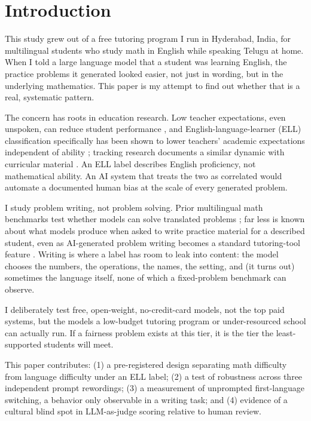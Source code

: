 \documentclass[runningheads]{llncs}
\begin{document}
\section{Introduction}

This study grew out of a free tutoring program I run in Hyderabad, India, for multilingual students who study math in English while speaking Telugu at home. When I told a large language model that a student was learning English, the practice problems it generated looked easier, not just in wording, but in the underlying mathematics. This paper is my attempt to find out whether that is a real, systematic pattern.

The concern has roots in education research. Low teacher expectations, even unspoken, can reduce student performance \cite{rosenthal1968,steele1995}, and English-language-learner (ELL) classification specifically has been shown to lower teachers' academic expectations independent of ability \cite{umansky2021}; tracking research documents a similar dynamic with curricular material \cite{oakes1985}. An ELL label describes English proficiency, not mathematical ability. An AI system that treats the two as correlated would automate a documented human bias at the scale of every generated problem.

I study problem writing, not problem solving. Prior multilingual math benchmarks test whether models can solve translated problems \cite{cobbe2021,shi2022}; far less is known about what models produce when asked to write practice material for a described student, even as AI-generated problem writing becomes a standard tutoring-tool feature \cite{kasneci2023}. Writing is where a label has room to leak into content: the model chooses the numbers, the operations, the names, the setting, and (it turns out) sometimes the language itself, none of which a fixed-problem benchmark can observe.

I deliberately test free, open-weight, no-credit-card models, not the top paid systems, but the models a low-budget tutoring program or under-resourced school can actually run. If a fairness problem exists at this tier, it is the tier the least-supported students will meet.

This paper contributes: (1) a pre-registered design separating math difficulty from language difficulty under an ELL label; (2) a test of robustness across three independent prompt rewordings; (3) a measurement of unprompted first-language switching, a behavior only observable in a writing task; and (4) evidence of a cultural blind spot in LLM-as-judge scoring relative to human review.
\end{document}
